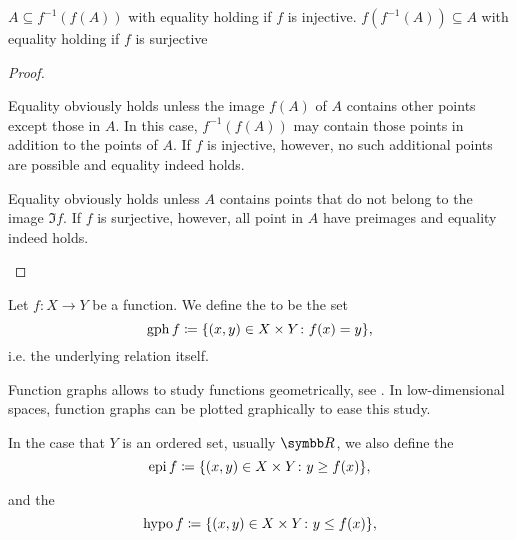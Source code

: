 \begin{proposition}\label{thm:function_image_preimage_composition}\mbox{}
  \begin{propenum}
     \( A \subseteq f^{-1}(f(A)) \) with equality holding if \( f \) is injective.
     \( f(f^{-1}(A)) \subseteq A \) with equality holding if \( f \) is surjective
  \end{propenum}
\end{proposition}
\begin{proof}
  \begin{description}
     Equality obviously holds unless the image \( f(A) \) of \( A \) contains other points except those in \( A \). In this case, \( f^{-1}(f(A)) \) may contain those points in addition to the points of \( A \). If \( f \) is injective, however, no such additional points are possible and equality indeed holds.

     Equality obviously holds unless \( A \) contains points that do not belong to the image \( \Im f \). If \( f \) is surjective, however, all point in \( A \) have preimages and equality indeed holds.
  \end{description}
\end{proof}

\begin{definition}\label{def:function_graph}
  Let \( f: X \to Y \) be a function. We define the  to be the set
  \begin{equation*}
    \operatorname{gph} f \coloneqq \{ (x, y) \in X \times Y \colon f(x) = y \},
  \end{equation*}
  i.e. the underlying relation itself.

  Function graphs allows to study functions geometrically, see . In low-dimensional spaces, function graphs can be plotted graphically to ease this study.

  In the case that \( Y \) is an ordered set, usually \( \BR \), we also define the 
  \begin{equation*}
    \operatorname{epi} f \coloneqq \{ (x, y) \in X \times Y \colon y \geq f(x) \},
  \end{equation*}

  and the 
  \begin{equation*}
    \operatorname{hypo} f \coloneqq \{ (x, y) \in X \times Y \colon y \leq f(x) \},
  \end{equation*}
\end{definition}

